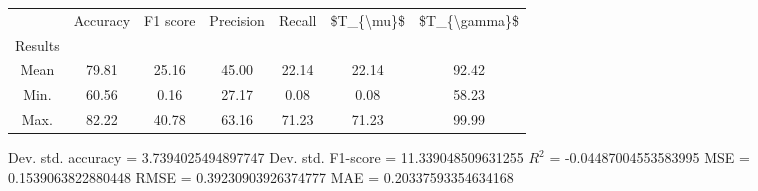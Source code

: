 \begin{tabular}{|c|c|c|c|c|c|c|}
\toprule
{} &  Accuracy &  F1 score &  Precision &  Recall &  \$T\_\{\textbackslash mu\}\$ &  \$T\_\{\textbackslash gamma\}\$ \\
Results &           &           &            &         &            &               \\
\hline
Mean    &     79.81 &     25.16 &      45.00 &   22.14 &      22.14 &         92.42 \\
Min.    &     60.56 &      0.16 &      27.17 &    0.08 &       0.08 &         58.23 \\
Max.    &     82.22 &     40.78 &      63.16 &   71.23 &      71.23 &         99.99 \\
\bottomrule
\end{tabular}

 Dev. std. accuracy = 3.7394025494897747
 Dev. std. F1-score = 11.339048509631255
 $R^2$ = -0.04487004553583995
 MSE = 0.1539063822880448
 RMSE = 0.39230903926374777
 MAE = 0.20337593354634168